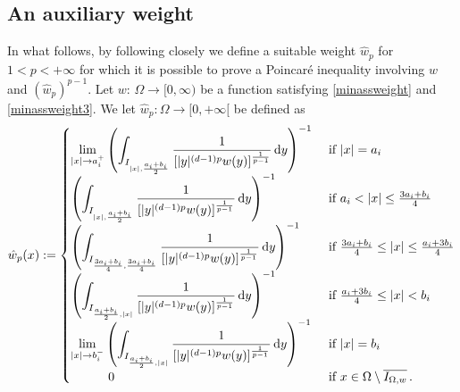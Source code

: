 \documentclass[11pt,leqno]{amsart}
\theoremstyle{remark}
\theoremstyle{definition}
\theoremstyle{definition}
\newcommand{\wstar}{{\hat w}}
\def\de{{\rm d}}
\begin{document}
\subsection{An auxiliary weight}
In what follows, by following closely \cite{CCMH1} we define a suitable weight $\hat{w}_{p}$ for $1<p<+\infty$ for which it is possible to prove a Poincar\'e inequality involving $w$ and $(\hat{w}_{p})^{p-1}$.
Let $w:\,\Omega\to [0,\infty)$ be a function satisfying \eqref{minassweight} and \eqref{minassweight3}. We let $\wstar_{p}:\Omega\to [0,+\infty[$ be defined as
\begin{equation}\label{pesop}
\wstar_{p}(x):=
\begin{cases}
\displaystyle\lim_{\vert x\vert\to a_i^+}  \left(\int_{I_{\vert x\vert,\frac{a_{i}+b_{i}}{2}}}\frac{1}{[\vert y\vert^{(d-1)p} w(y)]^{\frac{1}{p-1}}}\,\de y\right)^{-1}    &\text{ if } \vert x\vert=a_i \\
\left(\displaystyle\int_{I_{\vert x\vert,\frac{a_{i}+b_{i}}{2}}}\frac{1}{[\vert y\vert^{(d-1)p} w(y)]^{\frac{1}{p-1}}}\,\de y\right)^{-1} &\text{ if } {a_i}< \vert x\vert \leq {{3a_i+b_i}\over{4}}\\
\left(\displaystyle\int_{I_{\frac{3a_{i}+b_{i}}{4},\frac{3a_{i}+b_{i}}{4}}}\frac{1}{[\vert y\vert^{(d-1)p} w(y)]^{\frac{1}{p-1}}}\,\de y\right)^{-1} &\text{ if } {{3a_i+b_i}\over{4}}\leq \vert x\vert\leq {{a_i+3b_i}\over{4}}\\
\left(\displaystyle\int_{I_{\frac{a_{i}+b_{i}}{2},\vert x\vert }}\frac{1}{[\vert y\vert^{(d-1)p} w(y)]^{\frac{1}{p-1}}}\,\de y\right)^{-1} &\text{ if } {{a_i+3b_i}\over{4}}\leq \vert x\vert<b_i\\
\displaystyle\lim_{\vert x\vert\to b_i^-}  \left(\displaystyle\int_{I_{\frac{a_{i}+b_{i}}{2},\vert x\vert}}\frac{1}{[\vert y\vert^{(d-1)p} w(y)]^{\frac{1}{p-1
}}}\,\de y\right)^{-1}    &\text{ if } \vert x\vert=b_i\\
\ \ \ \ \ \ \ \ \ 0&\text{ if } x\in \Omega\setminus \overline{I_{\Omega,w}}\,.
\end{cases}
\end{equation}
\end{document}
